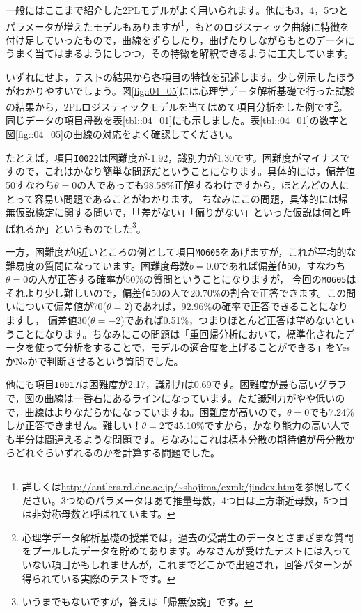 \documentclass{ltjsbook}
\begin{document}
一般にはここまで紹介した2PLモデルがよく用いられます。他にも3，4，5つとパラメータが増えたモデルもありますが\footnote{詳しくは\url{http://antlers.rd.dnc.ac.jp/~shojima/exmk/jindex.htm}を参照してください。3つめのパラメータはあて推量母数，4つ目は上方漸近母数，5つ目は非対称母数と呼ばれています。}，もとのロジスティック曲線に特徴を付け足していったもので，曲線をずらしたり，曲げたりしながらもとのデータにうまく当てはまるようにしつつ，その特徴を解釈できるように工夫しています。

いずれにせよ，テストの結果から各項目の特徴を記述します。少し例示したほうがわかりやすいでしょう。図\ref{fig::04_05}には心理学データ解析基礎で行った試験の結果から，2PLロジスティックモデルを当てはめて項目分析をした例です\footnote{心理学データ解析基礎の授業では，過去の受講生のデータとさまざまな質問をプールしたデータを貯めてあります。みなさんが受けたテストには入っていない項目かもしれませんが，これまでどこかで出題され，回答パターンが得られている実際のテストです。}。同じデータの項目母数を表\ref{tbl::04_01}にも示しました。表\ref{tbl::04_01}の数字と図\ref{fig::04_05}の曲線の対応をよく確認してください。

たとえば，項目\texttt{I0022}は困難度が-1.92，識別力が1.30です。困難度がマイナスですので，これはかなり簡単な問題だということになります。具体的には，偏差値50すなわち$\theta=0$の人であっても98.58\%正解するわけですから，ほとんどの人にとって容易い問題であることがわかります。
ちなみにこの問題，具体的には帰無仮説検定に関する問いで，「「差がない」「偏りがない」といった仮説は何と呼ばれるか」というものでした\footnote{いうまでもないですが，答えは「帰無仮説」です。}。

一方，困難度が0近いところの例として項目\texttt{M0605}をあげますが，これが平均的な難易度の質問になっています。困難度母数$b=0.0$であれば偏差値50，すなわち$\theta=0$の人が正答する確率が50\%の質問ということになりますが，
今回の\texttt{M0605}はそれより少し難しいので，偏差値50の人で20.70\%の割合で正答できます。この問いについて偏差値が70($\theta=2$)であれば，92.96\%の確率で正答できることになりますし，
偏差値30($\theta=-2$)であれば0.51\%，つまりほとんど正答は望めないということになります。ちなみにこの問題は「重回帰分析において，標準化されたデータを使って分析をすることで，モデルの適合度を上げることができる」をYesかNoかで判断させるという質問でした。

他にも項目\texttt{I0017}は困難度が2.17，識別力は0.69です。困難度が最も高いグラフで，図の曲線は一番右にあるラインになっています。ただ識別力がやや低いので，曲線はよりなだらかになっていますね。困難度が高いので，$\theta=0$でも7.24\%しか正答できません。難しい！$\theta=2$で45.10\%ですから，かなり能力の高い人でも半分は間違えるような問題です。ちなみにこれは標本分散の期待値が母分散からどれぐらいずれるのかを計算する問題でした。
\end{document}
